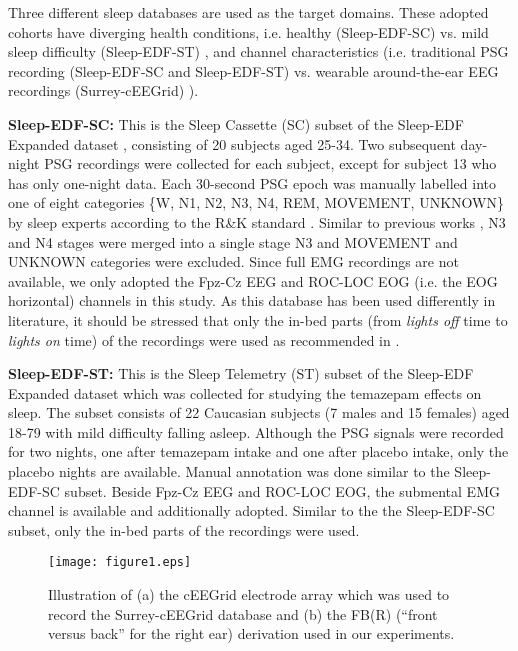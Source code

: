 \documentclass[journal,twoside,web]{ieeecolor}
\begin{document}
Three different sleep databases are used as the target domains. These adopted cohorts have diverging health conditions, i.e. healthy (Sleep-EDF-SC) vs. mild sleep difficulty (Sleep-EDF-ST) \cite{Kemp2000, Goldberger2000}, and channel characteristics (i.e. traditional PSG recording (Sleep-EDF-SC and Sleep-EDF-ST) vs. wearable around-the-ear EEG recordings (Surrey-cEEGrid) \cite{Mikkelsen2019, Sterr2018}).

{\bf Sleep-EDF-SC:} This is the Sleep Cassette (SC) subset of the Sleep-EDF Expanded dataset \cite{Kemp2000, Goldberger2000}, consisting of 20 subjects aged 25-34. Two subsequent day-night PSG recordings were collected for each subject, except for subject 13 who has only one-night data. Each 30-second PSG epoch was manually labelled into one of eight categories \{W, N1, N2, N3, N4, REM, MOVEMENT, UNKNOWN\} by sleep experts according to the R\&K standard \cite{Hobson1969}. Similar to previous works \cite{Tsinalis2016, Tsinalis2016b, Supratak2017, Phan2019b, phan2018c, phan2018d}, N3 and N4 stages were merged into a single stage N3 and MOVEMENT and UNKNOWN categories were excluded. Since full EMG recordings are not available, we only adopted the Fpz-Cz EEG and ROC-LOC EOG (i.e. the EOG horizontal) channels in this study. As this database has been used differently in literature, it should be stressed that only the in-bed parts (from \emph{lights off} time to \emph{lights on} time) of the recordings were used as recommended in \cite{Imtiaz2014,Imtiaz2015,Tsinalis2016, Tsinalis2016b, Phan2019b, phan2018c, phan2018d}.

{\bf Sleep-EDF-ST:} This is the Sleep Telemetry (ST) subset of the Sleep-EDF Expanded dataset\cite{Kemp2000, Goldberger2000} which was collected for studying the temazepam effects on sleep. The subset consists of 22 Caucasian subjects (7 males and 15 females) aged 18-79 with mild difficulty falling asleep. Although the PSG signals were recorded for two nights, one after temazepam intake and one after placebo intake, only the placebo nights are available. Manual annotation was done similar to the Sleep-EDF-SC subset. Beside Fpz-Cz EEG and ROC-LOC EOG, the submental EMG channel is available and additionally adopted. Similar to the the Sleep-EDF-SC subset, only the in-bed parts of the recordings were used.

\begin{figure} [!t]
	\centering
	\texttt{[image: figure1.eps]}
	\vspace{-0.1cm}
	\caption{Illustration of (a) the cEEGrid electrode array which was used to record the Surrey-cEEGrid database \cite{Mikkelsen2019, Sterr2018} and (b) the FB(R) (``front versus back'' for the right ear) derivation \cite{Mikkelsen2019} used in our experiments.}
	\label{fig:cEEGrid}
	\vspace{-0.3cm}
\end{figure}
\end{document}
